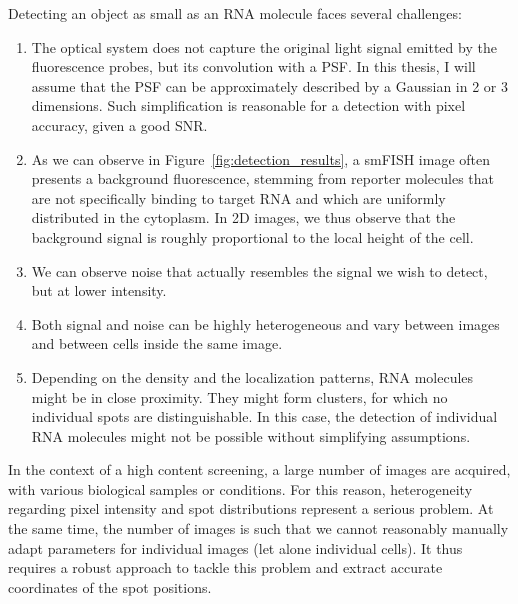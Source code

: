 \noindent
Detecting an object as small as an \ac{RNA} molecule faces several challenges:
\begin{enumerate}
	\setlength\itemsep{0.1em}
	\item The optical system does not capture the original light signal emitted by the fluorescence probes, but its convolution with a \ac{PSF}.
	In this thesis, I will assume that the \ac{PSF} can be approximately described by a Gaussian in 2 or 3 dimensions.
	Such simplification is reasonable for a detection with pixel accuracy, given a good \ac{SNR}.
	\item As we can observe in Figure~\ref{fig:detection_results}, a \ac{smFISH} image often presents a background fluorescence, stemming from reporter molecules that are not specifically binding to target \ac{RNA} and which are uniformly distributed in the cytoplasm.
	In 2D images, we thus observe that the background signal is roughly proportional to the local height of the cell.
	\item We can observe noise that actually resembles the signal we wish to detect, but at lower intensity.
	\item Both signal and noise can be highly heterogeneous and vary between images and between cells inside the same image.
	\item Depending on the density and the localization patterns, \ac{RNA} molecules might be in close proximity.
	They might form clusters, for which no individual spots are distinguishable.
	In this case, the detection of individual \ac{RNA} molecules might not be possible without simplifying assumptions.
\end{enumerate}

In the context of a high content screening, a large number of images are acquired, with various biological samples or conditions.
For this reason, heterogeneity regarding pixel intensity and spot distributions represent a serious problem.
At the same time, the number of images is such that we cannot reasonably manually adapt parameters for individual images (let alone individual cells).
It thus requires a robust approach to tackle this problem and extract accurate coordinates of the spot positions.

